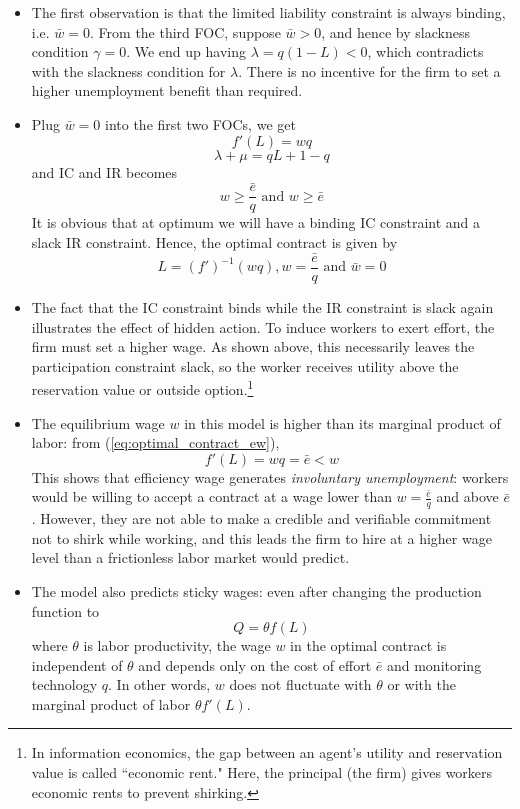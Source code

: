 \documentclass[12pt]{article}
\begin{document}
\begin{itemize}
	\item The first observation is that the limited liability constraint is always binding, i.e. $\bar{w} = 0$. From the third FOC, suppose $\bar{w} > 0$, and hence by slackness condition $\gamma = 0$. We end up having $\lambda = q(1-L) < 0$, which contradicts with the slackness condition for $\lambda$. There is no incentive for the firm to set a higher unemployment benefit than required.
	\item Plug $\bar{w} = 0$ into the first two FOCs, we get
	\[f'(L) = wq\]
	\[\lambda + \mu  = qL + 1-q \]
	and IC and IR becomes
	\[w \geq \frac{\bar{e}}{q} \text{ and } w \geq \bar{e} \]
	It is obvious that at optimum we will have a binding IC constraint and a slack IR constraint. Hence, the optimal contract is given by
	\begin{equation} \label{eq:optimal_contract_ew}
		L = (f')^{-1}(wq), w = \frac{\bar{e}}{q} \text{ and } \bar{w} = 0
	\end{equation}
	\item The fact that the IC constraint binds while the IR constraint is slack again illustrates the effect of hidden action. To induce workers to exert effort, the firm must set a higher wage. As shown above, this necessarily leaves the participation constraint slack, so the worker receives utility above the reservation value or outside option.\footnote{In information economics, the gap between an agent's utility and reservation value is called ``economic rent." Here, the principal (the firm) gives workers economic rents to prevent shirking.} 
\item The equilibrium wage $w$ in this model is higher than its marginal product of labor: from (\ref{eq:optimal_contract_ew}), 
\[f'(L) = w q = \bar{e} < w\]
This shows that efficiency wage generates \textit{involuntary unemployment}: workers would be willing to accept a contract at a wage lower than $w = \frac{\bar{e}}{q}$ and above $\bar{e}$. However, they are not able to make a credible and verifiable commitment not to shirk while working, and this leads the firm to hire at a higher wage level than a frictionless labor market would predict.
\item The model also predicts sticky wages: even after changing the production function to 
\[Q = \theta f(L)\]
where $\theta$ is labor productivity, the wage $w$ in the optimal contract is independent of $\theta$ and depends only on the cost of effort $\bar{e}$ and monitoring technology $q$. In other words, $w$ does not fluctuate with $\theta$ or with the marginal product of labor $\theta f'(L)$.
\end{itemize}
\end{document}
